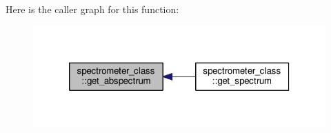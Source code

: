 Here is the caller graph for this function\+:\nopagebreak
\begin{figure}[H]
\begin{center}
\leavevmode
\includegraphics[width=320pt]{classspectrometer__class_ad2c4936524c8702e1c4e53a54a043f31_icgraph}
\end{center}
\end{figure}


\hypertarget{classspectrometer__class_a068171434fa75613677e6357291df1fe}{
}
